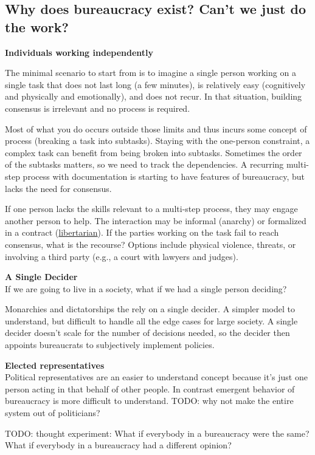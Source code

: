 \subsection{Why does bureaucracy exist? Can't we just do the work?}

\textbf{Individuals working independently}

The minimal scenario to start from is to imagine a single person working on a single task that does not last long (a few minutes), is relatively easy (cognitively and physically and emotionally), and does not recur. In that situation, building consensus is irrelevant and no process is required. 

Most of what you do occurs outside those limits and thus incurs some concept of \gls{process} (breaking a task into subtasks). Staying with the one-person constraint, a complex task can benefit from being broken into subtasks. Sometimes the order of the subtasks matters, so we need to track the dependencies. A recurring multi-step process with documentation is starting to have features of bureaucracy, but lacks the need for consensus. 

If one person lacks the skills relevant to a multi-step process, they may engage another person to help. The interaction may be informal (anarchy) or formalized in a contract (\href{https://en.wikipedia.org/wiki/Libertarianism}{libertarian}). If the parties working on the task fail to reach consensus, what is the recourse? Options include physical violence, threats, or involving a third party (e.g., a court with lawyers and judges). 

\textbf{A Single Decider}\\
If we are going to live in a society, what if we had a single person deciding?

Monarchies and dictatorships the rely on a single decider. A simpler model to understand, but difficult to handle all the edge cases for large society. A single decider doesn't scale for the number of decisions needed, so the decider then appoints bureaucrats to subjectively implement policies. 

\textbf{Elected representatives}\\
Political representatives are an easier to understand concept because it's just one person acting in that behalf of other people.
In contrast emergent behavior of bureaucracy is more difficult to understand. TODO: why not make the entire system out of politicians?


TODO: thought experiment: 
What if everybody in a bureaucracy were the same?
What if everybody in a bureaucracy had a different opinion?


